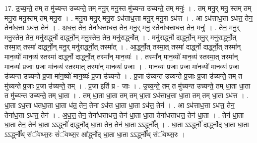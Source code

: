 \documentclass[17pt]{extarticle}
\begin{document}
17. उ॒च्य॒न्ते॒ तम् त मु॑च्यन्त उच्यन्ते॒ तम् मनु॒र् मनु॒स्त मु॑च्यन्त उच्यन्ते॒ तम् मनुः॑ । . तम् मनु॒र् मनु॒ स्तम् तम् मनु॒रा मनु॒स्तम् तम् मनु॒रा । . मनु॒रा मनु॒र् मनु॒रा ऽध॑त्ताध॒त्ता मनु॒र् मनु॒रा ऽध॑त्त । . आ ऽध॑त्ताध॒त्ता ऽध॑त्त॒ तेन॒ तेना॑ध॒त्ता ऽध॑त्त॒ तेन॑ । . अ॒ध॒त्त॒ तेन॒ तेना॑धत्ताधत्त॒ तेन॒ मनु॒र् मनु॒ स्तेना॑धत्ताधत्त॒ तेन॒ मनुः॑ । . तेन॒ मनु॒र् मनु॒स्तेन॒ तेन॒ मनु॑रार्द्ध्नो दार्द्ध्नो॒न् मनु॒स्तेन॒ तेन॒ मनु॑रार्द्ध्नोत् । . मनु॑रार्द्ध्नो दार्द्ध्नो॒न् मनु॒र् मनु॑रार्द्ध्नो॒त् तस्मा॒त् तस्मा॑ दार्द्ध्नो॒न् मनु॒र् मनु॑रार्द्ध्नो॒त् तस्मा᳚त् । . आ॒र्द्ध्नो॒त् तस्मा॒त् तस्मा॑ दार्द्ध्नो दार्द्ध्नो॒त् तस्मा᳚न् मान॒व्यो॑ मान॒व्य॑ स्तस्मा॑ दार्द्ध्नो दार्द्ध्नो॒त् तस्मा᳚न् मान॒व्यः॑ । . तस्मा᳚न् मान॒व्यो॑ मान॒व्य॑ स्तस्मा॒त् तस्मा᳚न् मान॒व्यः॑ प्र॒जाः प्र॒जा मा॑न॒व्य॑ स्तस्मा॒त् तस्मा᳚न् मान॒व्यः॑ प्र॒जाः । . मा॒न॒व्यः॑ प्र॒जाः प्र॒जा मा॑न॒व्यो॑ मान॒व्यः॑ प्र॒जा उ॑च्यन्त उच्यन्ते प्र॒जा मा॑न॒व्यो॑ मान॒व्यः॑ प्र॒जा उ॑च्यन्ते । . प्र॒जा उ॑च्यन्त उच्यन्ते प्र॒जाः प्र॒जा उ॑च्यन्ते॒ तम् त मु॑च्यन्ते प्र॒जाः प्र॒जा उ॑च्यन्ते॒ तम् । . प्र॒जा इति॑ प्र - जाः । . उ॒च्य॒न्ते॒ तम् त मु॑च्यन्त उच्यन्ते॒ तम् धा॒ता धा॒ता त मु॑च्यन्त उच्यन्ते॒ तम् धा॒ता । . तम् धा॒ता धा॒ता तम् तम् धा॒ता ऽध॑त्ताध॒त्ता धा॒ता तम् तम् धा॒ता ऽध॑त्त । . धा॒ता ऽध॒त्ता ध॑तधा॒ता धा॒ता ध॑त॒ तेन॒ तेना ऽध॑त्त धा॒ता धा॒ता ऽध॑त्त॒ तेन॑ । . आ ऽध॑त्ताध॒त्ता ऽध॑त्त॒ तेन॒ तेना॑ध॒त्ता ऽध॑त्त॒ तेन॑ । . अ॒ध॒त्त॒ तेन॒ तेना॑धत्ताधत्त॒ तेन॑ धा॒ता धा॒ता तेना॑धत्ताधत्त॒ तेन॑ धा॒ता । . तेन॑ धा॒ता धा॒ता तेन॒ तेन॑ धा॒ता ऽऽर्द्ध्नो॑ दार्द्ध्नोद् धा॒ता तेन॒ तेन॑ धा॒ता ऽऽर्द्ध्नो᳚त् । . धा॒ता ऽऽर्द्ध्नो॑ दार्द्ध्नोद् धा॒ता धा॒ता ऽऽर्द्ध्नो᳚थ् संॅवथ्स॒रः सं॑ॅवथ्स॒र आ᳚र्द्ध्नोद् धा॒ता धा॒ता ऽऽर्द्ध्नो᳚थ् संॅवथ्स॒रः । \newline
\end{document}
